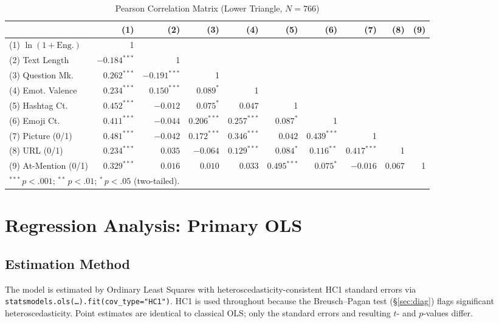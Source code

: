 \documentclass[12pt,a4paper]{article}
\begin{document}
\begin{table}[H]
\centering
\caption{Pearson Correlation Matrix (Lower Triangle, $N=766$)}
\label{tab:corr_full}
\small
\setlength{\tabcolsep}{3pt}
\begin{tabular}{lrrrrrrrrr}
\toprule
 & (1) & (2) & (3) & (4) & (5) & (6) & (7) & (8) & (9) \\
\midrule
(1) $\ln(1+\text{Eng.})$ & 1 & & & & & & & & \\
(2) Text Length & $-0.184^{***}$ & 1 & & & & & & & \\
(3) Question Mk. & $0.262^{***}$ & $-0.191^{***}$ & 1 & & & & & & \\
(4) Emot. Valence & $0.234^{***}$ & $0.150^{***}$ & $0.089^{*}$ & 1 & & & & & \\
(5) Hashtag Ct. & $0.452^{***}$ & $-0.012$ & $0.075^{*}$ & $0.047$ & 1 & & & & \\
(6) Emoji Ct. & $0.411^{***}$ & $-0.044$ & $0.206^{***}$ & $0.257^{***}$ & $0.087^{*}$ & 1 & & & \\
(7) Picture (0/1) & $0.481^{***}$ & $-0.042$ & $0.172^{***}$ & $0.346^{***}$ & $0.042$ & $0.439^{***}$ & 1 & & \\
(8) URL (0/1) & $0.234^{***}$ & $0.035$ & $-0.064$ & $0.129^{***}$ & $0.084^{*}$ & $0.116^{**}$ & $0.417^{***}$ & 1 & \\
(9) At-Mention (0/1) & $0.329^{***}$ & $0.016$ & $0.010$ & $0.033$ & $0.495^{***}$ & $0.075^{*}$ & $-0.016$ & $0.067$ & 1 \\
\bottomrule
\multicolumn{10}{l}{\small $^{***}\,p<.001$;\; $^{**}\,p<.01$;\; $^{*}\,p<.05$ (two-tailed).} \\
\end{tabular}
\end{table}

\newpage

\section{Regression Analysis: Primary OLS}

\subsection{Estimation Method}

The model is estimated by Ordinary Least Squares with heteroscedasticity-consistent HC1 standard errors via \texttt{statsmodels.ols(\ldots).fit(cov\_type="HC1")}. HC1 is used throughout because the Breusch--Pagan test (§\ref{sec:diag}) flags significant heteroscedasticity. Point estimates are identical to classical OLS; only the standard errors and resulting $t$- and $p$-values differ.
\end{document}
